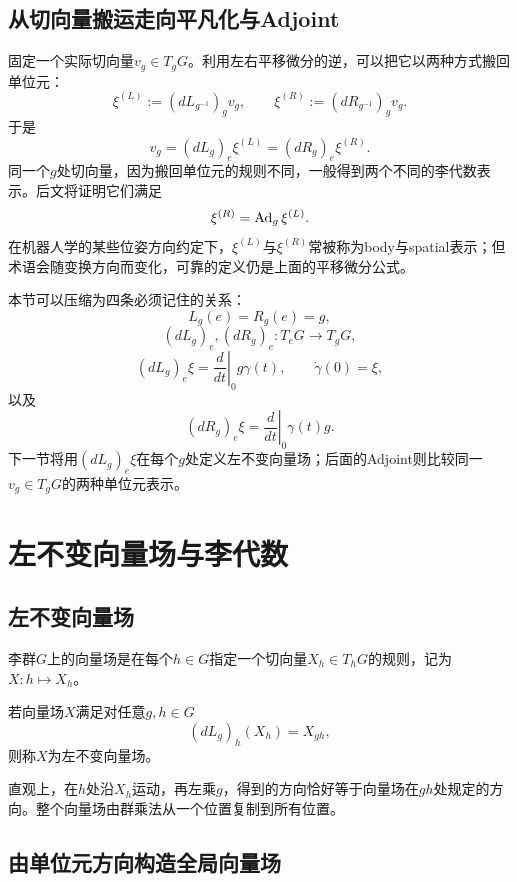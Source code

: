 \subsection{从切向量搬运走向平凡化与Adjoint}

固定一个实际切向量$v_g\in T_gG$。利用左右平移微分的逆，可以把它以两种方式搬回单位元：
\[
    \xi^{(L)}
    :=(dL_{g^{-1}})_g v_g,
    \qquad
    \xi^{(R)}
    :=(dR_{g^{-1}})_g v_g.
\]
于是
\[
    \boxed{
    v_g
    =(dL_g)_e\xi^{(L)}
    =(dR_g)_e\xi^{(R)}.
    }
\]
同一个$g$处切向量，因为搬回单位元的规则不同，一般得到两个不同的李代数表示。后文将证明它们满足
\[
    \xi^{(R)}=\operatorname{Ad}_g\xi^{(L)}.
\]
在机器人学的某些位姿方向约定下，$\xi^{(L)}$与$\xi^{(R)}$常被称为body与spatial表示；但术语会随变换方向而变化，可靠的定义仍是上面的平移微分公式。

本节可以压缩为四条必须记住的关系：
\[
    L_g(e)=R_g(e)=g,
\]
\[
    (dL_g)_e,(dR_g)_e:T_eG\to T_gG,
\]
\[
    (dL_g)_e\xi
    =\left.\frac{d}{dt}\right|_0g\gamma(t),
    \qquad
    \dot\gamma(0)=\xi,
\]
以及
\[
    (dR_g)_e\xi
    =\left.\frac{d}{dt}\right|_0\gamma(t)g.
\]
下一节将用$(dL_g)_e\xi$在每个$g$处定义左不变向量场；后面的Adjoint则比较同一$v_g\in T_gG$的两种单位元表示。


\section{左不变向量场与李代数}

\subsection{左不变向量场}

\begin{definition}[向量场]
李群$G$上的向量场是在每个$h\in G$指定一个切向量$X_h\in T_hG$的规则，记为$X:h\mapsto X_h$。
\end{definition}

\begin{definition}[左不变向量场]
若向量场$X$满足对任意$g,h\in G$
\[
    (dL_g)_h(X_h)=X_{gh},
\]
则称$X$为左不变向量场。
\end{definition}

直观上，在$h$处沿$X_h$运动，再左乘$g$，得到的方向恰好等于向量场在$gh$处规定的方向。整个向量场由群乘法从一个位置复制到所有位置。

\subsection{由单位元方向构造全局向量场}

